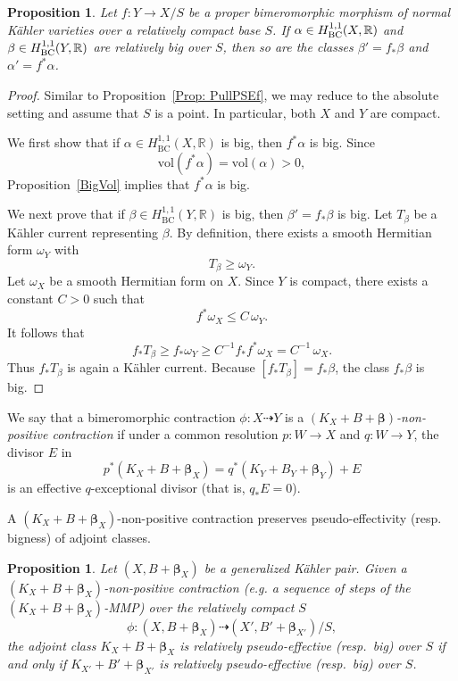 \documentclass[12pt]{amsart}
\numberwithin{equation}{section}
\newtheorem{proposition}[theorem]{Proposition}
\theoremstyle{definition}
\theoremstyle{plain}
\newtheorem*{thm A*}{Theorem A}
\newtheorem*{thm B*}{Theorem B}
\newtheorem*{thm C*}{Theorem C}
\newtheorem*{thm D*}{Theorem D}
\theoremstyle{definition}
\renewcommand{\1}{\mathds{1}}
\newcommand{\bbeta}{\boldsymbol{\beta}}
\renewcommand{\>}{\rightarrow}
\begin{document}
\begin{proposition}\label{Prop: PullBig}
Let $f: Y\rightarrow X/S$ be a proper bimeromorphic morphism of normal K\"ahler varieties over a relatively compact base $S$. If $\alpha \in H^{1,1}_{\rm BC}(X,\mathbb{R})$ and ${{\beta}} \in H^{1,1}_{\rm BC}(Y,\mathbb{R})$ are relatively big over $S$, then so are the classes ${{\beta}}' = f_*{{\beta}}$ and $\alpha' = f^*\alpha$.
\end{proposition}
\begin{proof}
Similar to Proposition~\ref{Prop: PullPSEf}, we may reduce to the absolute setting and assume that $S$ is a point. In particular, both $X$ and $Y$ are compact.

We first show that if $\alpha \in H^{1,1}_{\mathrm{BC}}(X, \mathbb{R})$ is big, then $f^{*}\alpha$ is big. Since
$$
\mathrm{vol}(f^{*}\alpha) = \mathrm{vol}(\alpha) > 0,
$$
Proposition~\ref{BigVol} implies that $f^{*}\alpha$ is big.

We next prove that if $\beta \in H^{1,1}_{\mathrm{BC}}(Y, \mathbb{R})$ is big, then $\beta' = f_{*}\beta$ is big. Let $T_{\beta}$ be a K\"ahler current representing $\beta$. By definition, there exists a smooth Hermitian form $\omega_{Y}$ with
$$
T_{\beta} \ge \omega_{Y}.
$$
Let $\omega_{X}$ be a smooth Hermitian form on $X$. Since $Y$ is compact, there exists a constant $C > 0$ such that
$$
f^{*}\omega_{X} \leq C\, \omega_{Y}.
$$
It follows that
$$
f_{*}T_{\beta} \ge f_{*}\omega_{Y} \ge C^{-1} f_{*}f^{*}\omega_{X}
  = C^{-1}\, \omega_{X}.
$$
Thus $f_{*}T_{\beta}$ is again a K\"ahler current. Because $[f_{*}T_{\beta}] = f_{*}\beta$, the class $f_{*}\beta$ is big.
\end{proof}

We say that a bimeromorphic contraction $ \phi : X \dashrightarrow Y $ is a \emph{$(K_X + B +  { {\bbeta}})$-non-positive contraction} if under a common resolution $ p : W \to X $ and $ q : W \to Y $, the divisor $ E $ in
\[
p^*(K_X + B +  { {\bbeta}_X}) = q^*(K_Y + B_Y +  { {\bbeta}}_Y) + E
\]
is an effective $ q $-exceptional divisor (that is, $ q_* E = 0 $).

A $(K_X+B+ \bbeta_X)$-non-positive contraction preserves pseudo-effectivity (resp. bigness) of adjoint classes. 
\begin{proposition}\label{PushPSEF}
Let $(X,B + \bbeta_X)$ be a generalized K\"ahler pair. Given a $(K_X+B+ \bbeta_X)$-non-positive contraction (e.g. a sequence of steps of the $(K_X+B + \bbeta_X)$-MMP) over the relatively compact $S$
\[
\phi : (X, B +  { \boldsymbol{\beta}_X}) 
\dashrightarrow 
(X', B' +  { \boldsymbol{\beta}}_{X'})/S,
\]
the adjoint class $ K_{X} + B +  { {\bbeta}_X} $ is relatively pseudo-effective (resp.\ big) over $ S $ if and only if $ K_{X'} + B' +  { {\bbeta}}_{X'}$ is relatively pseudo-effective (resp.\ big) over $ S $.
\end{proposition}
\end{document}
